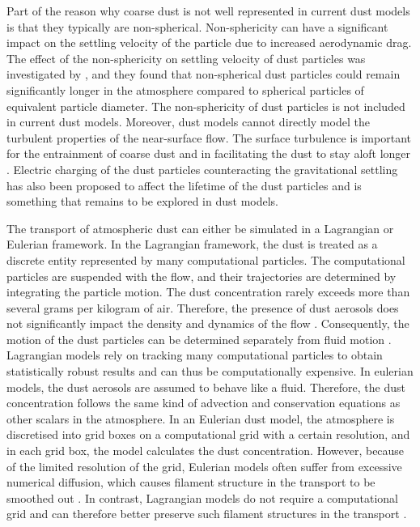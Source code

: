 Part of the reason why coarse dust is not well represented in current dust models is that they typically are non-spherical. Non-sphericity can have a significant impact on the settling velocity of the particle due to increased aerodynamic drag. The effect of the non-sphericity on settling velocity of dust particles was investigated by \textcite{mallios2020effects}, and they found that non-spherical dust particles could remain significantly longer in the atmosphere compared to spherical particles of equivalent particle diameter. The non-sphericity of dust particles is not included in current dust models. Moreover, dust models cannot directly model the turbulent properties of the near-surface flow. The surface turbulence is important for the entrainment of coarse dust \parencite{klose2013large} and in facilitating the dust to stay aloft longer \parencite{ryder2013impact}. Electric charging of the dust particles counteracting the gravitational settling has also been proposed to affect the lifetime of the dust particles and is something that remains to be explored in dust models.     

The transport of atmospheric dust can either be simulated in a Lagrangian or Eulerian framework.
In the Lagrangian framework, the dust is treated as a discrete entity represented by many computational particles.
The computational particles are suspended with the flow, and their trajectories are determined by integrating the particle motion. 
The dust concentration rarely exceeds more than several grams per kilogram of air. Therefore, the presence of dust aerosols does not significantly impact the density and dynamics of the flow \parencite{zhuang2001compositions}. Consequently, the motion of the dust particles can be determined separately from fluid motion \parencite{ShaoYaping2008PaMo}.
Lagrangian models rely on tracking many computational particles to obtain statistically robust results and can thus be computationally expensive. In eulerian models, the dust aerosols are assumed to behave like a fluid. Therefore, the dust concentration follows the same kind of advection and conservation equations as other scalars in the atmosphere. 
In an Eulerian dust model, the atmosphere is discretised into grid boxes on a computational grid with a certain resolution, and in each grid box, the model calculates the dust concentration. However, because of the limited resolution of the grid, Eulerian models often suffer from excessive numerical diffusion, which causes filament structure in the transport to be smoothed out \parencite{cassiani_offline_2016}. 
In contrast, Lagrangian models do not require a computational grid and can therefore better preserve such filament structures in the transport \parencite{cassiani_offline_2016}.         

